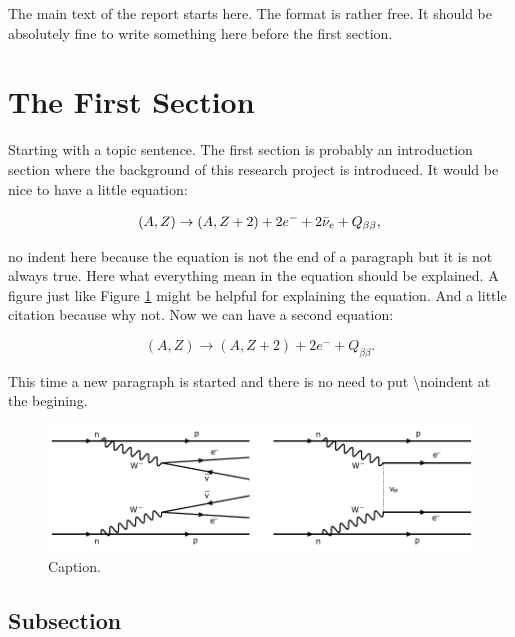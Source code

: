 The main text of the report starts here. The format is rather free. It should be absolutely fine to write something here before the first section.

\section{The First Section}

Starting with a topic sentence. The first section is probably an introduction section where the background of this research project is introduced. It would be nice to have a little equation:

\begin{equation}
    (A,Z) \rightarrow (A,Z+2) + 2e^- + 2\Bar{\nu}_e + Q_{\beta\beta},
\end{equation}

\noindent no indent here because the equation is not the end of a paragraph but it is not always true. Here what everything mean in the equation should be explained. A figure just like Figure \ref{fig:bb} might be helpful for explaining the equation. And a little citation \cite{Moe:2014ioa} because why not. Now we can have a second equation: 

\begin{equation}\label{eq:0nubd}
    (A,Z) \rightarrow (A,Z+2) + 2e^- + Q_{\beta\beta}.
\end{equation}

This time a new paragraph is started and there is no need to put \textbackslash noindent at the begining.

\begin{figure}[h]
\begin{center}
\includegraphics[width=15cm]{figures/2vbb_0vbb.pdf}
\end{center}
\caption{Caption.}\label{fig:bb}
\end{figure}


\subsection{Subsection}

